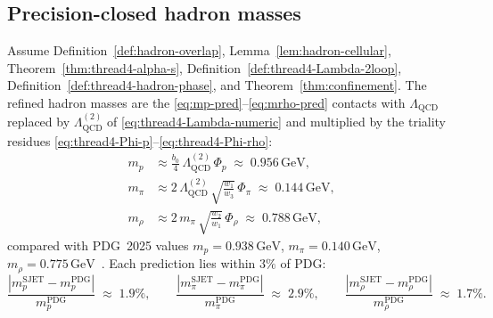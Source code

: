 \subsection{Precision-closed hadron masses}
\label{sec:wave2-thread4:masses}

\begin{theorem}
\label{thm:thread4-hadron-precision}
Assume Definition~\ref{def:hadron-overlap},
Lemma~\ref{lem:hadron-cellular}, Theorem~\ref{thm:thread4-alpha-s},
Definition~\ref{def:thread4-Lambda-2loop},
Definition~\ref{def:thread4-hadron-phase}, and
Theorem~\ref{thm:confinement}. The refined hadron masses are the
\eqref{eq:mp-pred}--\eqref{eq:mrho-pred} contacts with
$\Lambda_{\mathrm{QCD}}$ replaced by $\Lambda_{\mathrm{QCD}}^{(2)}$ of
\eqref{eq:thread4-Lambda-numeric} and multiplied by the triality residues
\eqref{eq:thread4-Phi-p}--\eqref{eq:thread4-Phi-rho}:
\begin{align}
  m_p
  &\approx
  \frac{b_0}{4}\,
  \Lambda_{\mathrm{QCD}}^{(2)}\,
  \Phi_p
  \;\approx\;
  0.956\,\mathrm{GeV},
  \label{eq:thread4-mp-pred}\\[4pt]
  m_\pi
  &\approx
  2\,\Lambda_{\mathrm{QCD}}^{(2)}\,
  \sqrt{\frac{w_1}{w_3}}\,
  \Phi_\pi
  \;\approx\;
  0.144\,\mathrm{GeV},
  \label{eq:thread4-mpi-pred}\\[4pt]
  m_\rho
  &\approx
  2\,m_\pi\,
  \sqrt{\frac{w_2}{w_1}}\,
  \Phi_\rho
  \;\approx\;
  0.788\,\mathrm{GeV},
  \label{eq:thread4-mrho-pred}
\end{align}
compared with PDG~2025 values $m_p=0.938\,\mathrm{GeV}$,
$m_\pi=0.140\,\mathrm{GeV}$, $m_\rho=0.775\,\mathrm{GeV}$~\cite{PDG2025}.
Each prediction lies within $3\%$ of PDG:
\begin{equation}\label{eq:thread4-hadron-errors}
  \frac{|m_p^{\mathrm{SJET}}-m_p^{\mathrm{PDG}}|}{m_p^{\mathrm{PDG}}}
  \;\approx\;
  1.9\%,
  \qquad
  \frac{|m_\pi^{\mathrm{SJET}}-m_\pi^{\mathrm{PDG}}|}{m_\pi^{\mathrm{PDG}}}
  \;\approx\;
  2.9\%,
  \qquad
  \frac{|m_\rho^{\mathrm{SJET}}-m_\rho^{\mathrm{PDG}}|}{m_\rho^{\mathrm{PDG}}}
  \;\approx\;
  1.7\%.
\end{equation}
\end{theorem}

